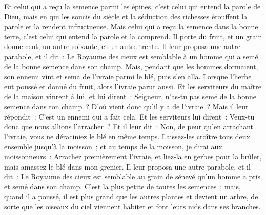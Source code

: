 \begin{multicols}{2}
Et celui qui a reçu la semence parmi les épines, c'est celui qui entend la parole de Dieu, mais en qui les soucis du siècle et la séduction des richesses étouffent la parole et la rendent infructueuse.
Mais celui qui a reçu la semence dans la bonne terre, c'est celui qui entend la parole et la comprend. Il porte du fruit, et un grain donne cent, un autre soixante, et un autre trente.
Il leur proposa une autre parabole, et il dit~: Le Royaume des cieux est semblable à un homme qui a semé de la bonne semence dans son champ.
Mais, pendant que les hommes dormaient, son ennemi vint et sema de l'ivraie parmi le blé, puis s'en alla.
Lorsque l'herbe eut poussé et donné du fruit, alors l'ivraie parut aussi.
Et les serviteurs du maître de la maison vinrent à lui, et lui dirent~: Seigneur, n'as-tu pas semé de la bonne semence dans ton champ~? D'où vient donc qu'il y a de l'ivraie~?
Mais il leur répondit~: C'est un ennemi qui a fait cela. Et les serviteurs lui dirent~: Veux-tu donc que nous allions l'arracher~?
Et il leur dit~: Non, de peur qu'en arrachant l'ivraie, vous ne déraciniez le blé en même temps.
Laissez-les croître tous deux ensemble jusqu'à la moisson~; et au temps de la moisson, je dirai aux moissonneurs~: Arrachez premièrement l'ivraie, et liez-la en gerbes pour la brûler, mais amassez le blé dans mon grenier.
Il leur proposa une autre parabole, et il dit~: Le Royaume des cieux est semblable au grain de sénevé qu'un homme a pris et semé dans son champ.
C'est la plus petite de toutes les semences~; mais, quand il a poussé, il est plus grand que les autres plantes et devient un arbre, de sorte que les oiseaux du ciel viennent habiter et font leurs nids dans ses branches.

\end{multicols}
